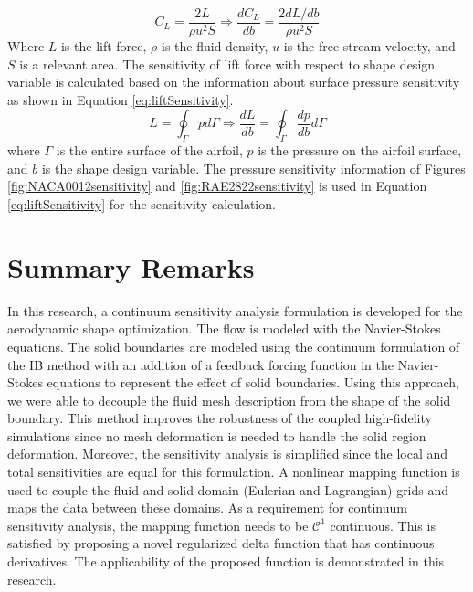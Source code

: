 \documentclass[12pt]{aiaa-pretty}
\begin{document}
%
\begin{equation}\label{eq:liftCoefficientSensitivity}
	C_L = \frac{2L}{\rho u^2 S} \Rightarrow \frac{d C_L}{db} = \frac{2 dL/db}{\rho u^2 S}
\end{equation}
%
Where $L$ is the lift force, $\rho$ is the fluid density, $u$ is the free stream velocity, and $S$ is a relevant area. The sensitivity of lift force with respect to shape design variable is calculated based on the information about surface pressure sensitivity as shown in Equation \eqref{eq:liftSensitivity}.
%
\begin{equation}\label{eq:liftSensitivity}
	L = \oint_\Gamma p d\Gamma \Rightarrow \frac{dL}{db} = \oint_\Gamma \frac{dp}{db} d\Gamma
\end{equation}
%
where $\Gamma$ is the entire surface of the airfoil, $p$ is the pressure on the airfoil surface, and $b$ is the shape design variable. The pressure sensitivity information of Figures \ref{fig:NACA0012sensitivity} and \ref{fig:RAE2822sensitivity} is used in Equation \eqref{eq:liftSensitivity} for the sensitivity calculation.
\section{Summary Remarks}
In this research, a continuum sensitivity analysis formulation is developed for the aerodynamic shape optimization. The flow is modeled with the Navier-Stokes equations. The solid boundaries are modeled using the continuum formulation of the IB method with an addition of a feedback forcing function in the Navier-Stokes equations to represent the effect of solid boundaries. Using this approach, we were able to decouple the fluid mesh description from the shape of the solid boundary. This method improves the robustness of the coupled high-fidelity simulations since no mesh deformation is needed to handle the solid region deformation. Moreover, the sensitivity analysis is simplified since the local and total sensitivities are equal for this formulation. A nonlinear mapping function is used to couple the fluid and solid domain (Eulerian and Lagrangian) grids and maps the data between these domains. As a requirement for continuum sensitivity analysis, the mapping function needs to be $\mathcal{C}^1$ continuous. This is satisfied by proposing a novel regularized delta function that has continuous derivatives. The applicability of the proposed function is demonstrated in this research.
\end{document}

